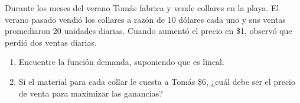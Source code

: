 \item Durante los meses del verano Tomás fabrica y vende collares en la playa. El verano pasado vendió los collares a razón de 10 dólares cada uno y sus ventas promediaron 20 unidades diarias. Cuando aumentó el precio en \$1, observó que perdió dos ventas diarias.
\begin{enumerate}
    \item[(a)] Encuentre la función demanda, suponiendo que es lineal.
    \item[(b)] Si el material para cada collar le cuesta a Tomás \$6, ¿cuál debe ser el precio de venta para maximizar las ganancias?
\end{enumerate}
